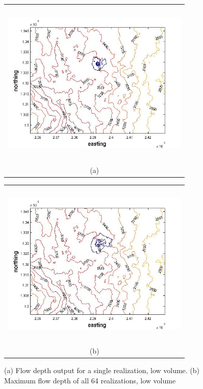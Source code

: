 \documentclass[a4paper,fleqn]{article}
\begin{document}
\begin{figure}[H]
    \begin{minipage}[b]{0.6\textwidth}
        \begin{tabular}{c}
        \includegraphics[width=9cm,height=8cm,keepaspectratio]{sample1_low_flow_res.jpg}\\
        (a)
        \end{tabular}
    \end{minipage}
    \begin{minipage}{0.6\textwidth}
        \begin{tabular}{c}
        \includegraphics[width=9cm,height=8cm,keepaspectratio]{all_low_flow_res.jpg}\\
        (b)
        \end{tabular}
    \end{minipage} 
\caption{(a) Flow depth output for a single realization, low volume. (b) Maximum flow depth of all 64 realizations, low volume }
\label{fig2}  
\end{figure}
\end{document}
